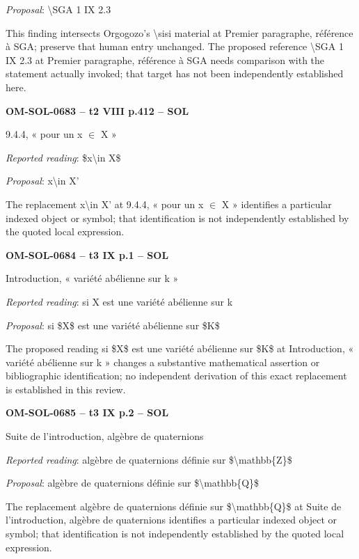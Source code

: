 \emph{Proposal}: \textbackslash{}SGA 1 IX 2.3\par
This finding intersects Orgogozo's \textbackslash{}sisi material at Premier paragraphe, référence à SGA; preserve that human entry unchanged. The proposed reference \textbackslash{}SGA 1 IX 2.3 at Premier paragraphe, référence à SGA needs comparison with the statement actually invoked; that target has not been independently established here.\par
\par\noindent\textbf{OM-SOL-0683 -- t2 VIII p.412 -- SOL}\par
9.4.4, « pour un x \ensuremath{\in} X »\par
\emph{Reported reading}: \$x\textbackslash{}in X\$\par
\emph{Proposal}: x\textbackslash{}in X'\par
The replacement x\textbackslash{}in X' at 9.4.4, « pour un x \ensuremath{\in} X » identifies a particular indexed object or symbol; that identification is not independently established by the quoted local expression.\par
\par\noindent\textbf{OM-SOL-0684 -- t3 IX p.1 -- SOL}\par
Introduction, « variété abélienne sur k »\par
\emph{Reported reading}: si X est une variété abélienne sur k\par
\emph{Proposal}: si \$X\$ est une variété abélienne sur \$K\$\par
The proposed reading si \$X\$ est une variété abélienne sur \$K\$ at Introduction, « variété abélienne sur k » changes a substantive mathematical assertion or bibliographic identification; no independent derivation of this exact replacement is established in this review.\par
\par\noindent\textbf{OM-SOL-0685 -- t3 IX p.2 -- SOL}\par
Suite de l'introduction, algèbre de quaternions\par
\emph{Reported reading}: algèbre de quaternions définie sur \$\textbackslash{}mathbb\{Z\}\$\par
\emph{Proposal}: algèbre de quaternions définie sur \$\textbackslash{}mathbb\{Q\}\$\par
The replacement algèbre de quaternions définie sur \$\textbackslash{}mathbb\{Q\}\$ at Suite de l'introduction, algèbre de quaternions identifies a particular indexed object or symbol; that identification is not independently established by the quoted local expression.\par
